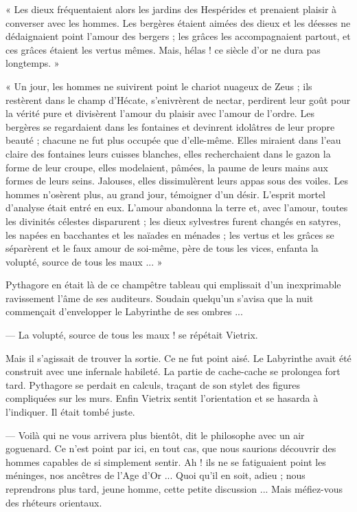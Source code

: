 \documentclass[a4paper, 11pt, oneside, polutonikogreek, french]{article}
\begin{document}
« Les dieux fréquentaient alors les jardins des Hespérides et prenaient plaisir à converser avec les hommes. Les bergères étaient aimées des dieux et les déesses ne dédaignaient point l'amour des bergers ; les grâces les accompagnaient partout, et ces grâces étaient les vertus mêmes. Mais, hélas ! ce siècle d'or ne dura pas longtemps. »

« Un jour, les hommes ne suivirent point le chariot nuageux de Zeus ; ils restèrent dans le champ d'Hécate, s'enivrèrent de nectar, perdirent leur goût pour la vérité pure et divisèrent l'amour du plaisir avec l'amour de l'ordre. Les bergères se regardaient dans les fontaines et devinrent idolâtres de leur propre beauté ; chacune ne fut plus occupée que d'elle-même. Elles miraient dans l'eau claire des fontaines leurs cuisses blanches, elles recherchaient dans le gazon la forme de leur croupe, elles modelaient, pâmées, la paume de leurs mains aux formes de leurs seins. Jalouses, elles dissimulèrent leurs appas sous des voiles. Les hommes n'osèrent plus, au grand jour, témoigner d'un désir. L'esprit mortel d'analyse était entré en eux. L'amour abandonna la terre et, avec l'amour, toutes les divinités célestes disparurent ; les dieux sylvestres furent changés en satyres, les napées en bacchantes et les naïades en ménades ; les vertus et les grâces se séparèrent et le faux amour de soi-même, père de tous les vices, enfanta la volupté, source de tous les maux ... »

\bigskip
\centerline{\EightStarTaper}
\centerline{\EightStarTaper\EightStarTaper}
\bigskip

Pythagore en était là de ce champêtre tableau qui emplissait d'un inexprimable ravissement l'âme de ses auditeurs. Soudain quelqu'un s'avisa que la nuit commençait d'envelopper le Labyrinthe de ses ombres ...

--- La volupté, source de tous les maux ! se répétait Vietrix.

Mais il s'agissait de trouver la sortie. Ce ne fut point aisé. Le Labyrinthe avait été construit avec une infernale habileté. La partie de cache-cache se prolongea fort tard. Pythagore se perdait en calculs, traçant de son stylet des figures compliquées sur les murs. Enfin Vietrix sentit l'orientation et se hasarda à l'indiquer. Il était tombé juste.

--- Voilà qui ne vous arrivera plus bientôt, dit le philosophe avec un air goguenard. Ce n'est point par ici, en tout cas, que nous saurions découvrir des hommes capables de si simplement sentir. Ah ! ils ne se fatiguaient point les méninges, nos ancêtres de l'Age d'Or ... Quoi qu'il en soit, adieu ; nous reprendrons plus tard, jeune homme, cette petite discussion ... Mais méfiez-vous des rhéteurs orientaux.
\end{document}
